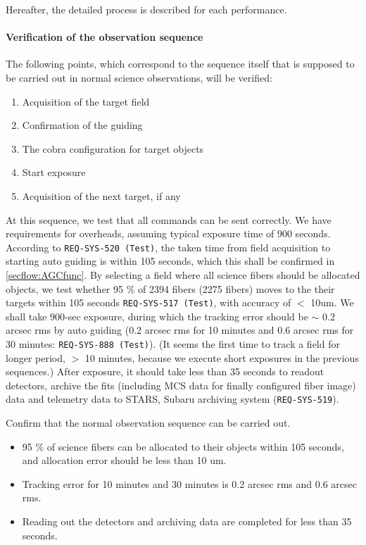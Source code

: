 Hereafter, the detailed process is described for each performance.

\paragraph{Verification of the observation sequence}
The following points, which correspond to the sequence itself that is supposed to be carried out in normal science observations, will be verified:

\begin{enumerate}
\item{Acquisition of the target field}
\item{Confirmation of the guiding}
\item{The cobra configuration for target objects}
\item{Start exposure}
\item{Acquisition of the next target, if any}
\end{enumerate}

At this sequence, we test that all commands can be sent correctly.
We have requirements for overheads, assuming typical exposure time of 900 seconds.
According to {\tt REQ-SYS-520 (Test)}, the taken time from field acquisition to starting auto guiding is within 105 seconds, which this shall be confirmed in \ref{secflow:AGCfunc}.
By selecting a field where all science fibers should be allocated objects, we test whether 95 \% of 2394 fibers (2275 fibers) moves to the their targets within 105 seconds {\tt REQ-SYS-517 (Test)}, with accuracy of $<$ 10um. 
We shall take 900-sec exposure, during which the tracking error should be $\sim$ 0.2 arcsec rms by auto guiding (0.2 arcsec rms for 10 minutes and 0.6 arcsec rms for 30 minutes: {\tt REQ-SYS-888 (Test)}).
(It seems the first time to track a field for longer period, $>$ 10 minutes, because we execute short exposures in the previous sequences.)
After exposure, it should take less than 35 seconds to readout detectors, archive the fits (including MCS data for finally configured fiber image) data and telemetry data to STARS, Subaru archiving system ({\tt REQ-SYS-519}). 


\begin{itembox}[l]{}
Confirm that the normal observation sequence can be carried out.
\begin{itemize}
\item 95 \% of science fibers can be allocated to their objects within 105 seconds, and allocation error should be less than 10 um. 
\item Tracking error for 10 minutes and 30 minutes is 0.2 arcsec rms and 0.6 arcsec rms. 
\item Reading out the detectors and archiving data are completed for less than 35 seconds. 
\end{itemize}
\end{itembox}

